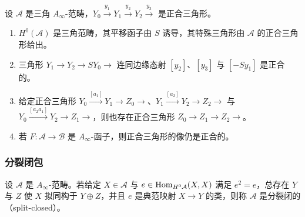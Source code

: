 \begin{proposition}\label{prop:2.3}
设 $\mathcal{A}$ 是三角 $A_\infty$-范畴，$Y_0\xrightarrow{y_1}Y_1\xrightarrow{y_2}Y_2\xrightarrow{y_3}$ 是正合三角形。
\begin{enumerate}[label=\arabic*., leftmargin=2em, itemsep=2pt]
  \item $H^0(\mathcal{A})$ 是三角范畴，其平移函子由 $S$ 诱导，其特殊三角形由 $\mathcal{A}$ 的正合三角形给出。
  \item 三角形 $Y_1\to Y_2\to SY_0\to$ 连同边缘态射 $[y_2]$、$[y_3]$ 与 $[-Sy_1]$ 是正合的。
  \item 给定正合三角形 $Y_0\xrightarrow{[a_1]}Y_1\to Z_0\to$、$Y_1\xrightarrow{[a_2]}Y_2\to Z_2\to$ 与 $Y_0\xrightarrow{[a_2a_1]}Y_2\to Z_1\to$，则也存在正合三角形 $Z_0\to Z_1\to Z_2\to$。
  \item 若 $F\colon\mathcal{A}\to\mathcal{B}$ 是 $A_\infty$-函子，则正合三角形的像仍是正合的。
\end{enumerate}
\end{proposition}


\subsubsection*{分裂闭包}

\begin{definition*}
设 $\mathcal{A}$ 是 $A_\infty$-范畴。若给定 $X\in\mathcal{A}$ 与 $e\in\operatorname{Hom}_{H^0\mathcal{A}}(X,X)$ 满足 $e^2=e$，总存在 $Y$ 与 $Z$ 使 $X$ 拟同构于 $Y\oplus Z$，并且 $e$ 是典范映射 $X\to Y$ 的类，则称 $\mathcal{A}$ 是分裂闭的（split-closed）。
\end{definition*}


